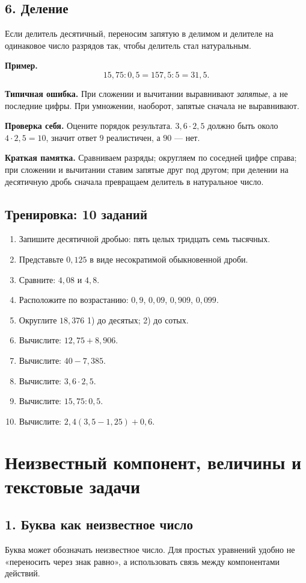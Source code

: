 \documentclass[12pt,a4paper]{article}
\newcommand{\mistake}[1]{%
  \par\smallskip
  {\color{accent}\textbf{Типичная ошибка.}} #1\par\smallskip
}
\newcommand{\selfcheck}[1]{%
  \par\smallskip
  {\color{accent}\textbf{Проверка себя.}} #1\par\smallskip
}
\newcommand{\memo}[1]{%
  \par\smallskip
  \begingroup
  \setlength{\fboxsep}{7pt}%
  \colorbox{accentlight}{\parbox{0.94\textwidth}{\textbf{Краткая памятка.} #1}}%
  \endgroup
  \par\smallskip
}
\newcommand{\trainingtitle}{\subsection*{Тренировка: 10 заданий}}
\begin{document}
\subsection*{6. Деление}
Если делитель десятичный, переносим запятую в делимом и делителе на одинаковое число разрядов так, чтобы делитель стал натуральным.

\textbf{Пример.}
\[
15{,}75:0{,}5=157{,}5:5=31{,}5.
\]

\mistake{При сложении и вычитании выравнивают \emph{запятые}, а не последние цифры. При умножении, наоборот, запятые сначала не выравнивают.}

\selfcheck{Оцените порядок результата. $3{,}6\cdot2{,}5$ должно быть около $4\cdot2{,}5=10$, значит ответ $9$ реалистичен, а $90$ --- нет.}

\memo{Сравниваем разряды; округляем по соседней цифре справа; при сложении и вычитании ставим запятые друг под другом; при делении на десятичную дробь сначала превращаем делитель в натуральное число.}

\trainingtitle
\begin{enumerate}
  \item Запишите десятичной дробью: пять целых тридцать семь тысячных.
  \item Представьте $0{,}125$ в виде несократимой обыкновенной дроби.
  \item Сравните: $4{,}08$ и $4{,}8$.
  \item Расположите по возрастанию: $0{,}9$, $0{,}09$, $0{,}909$, $0{,}099$.
  \item Округлите $18{,}376$ 1) до десятых; 2) до сотых.
  \item Вычислите: $12{,}75+8{,}906$.
  \item Вычислите: $40-7{,}385$.
  \item Вычислите: $3{,}6\cdot2{,}5$.
  \item Вычислите: $15{,}75:0{,}5$.
  \item Вычислите: $2{,}4(3{,}5-1{,}25)+0{,}6$.
\end{enumerate}

\newpage

\section{Неизвестный компонент, величины и текстовые задачи}

\subsection*{1. Буква как неизвестное число}
Буква может обозначать неизвестное число. Для простых уравнений удобно не «переносить через знак равно», а использовать связь между компонентами действий.
\end{document}
